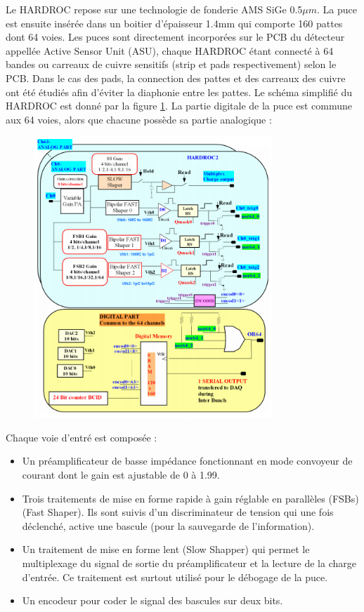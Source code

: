 Le HARDROC repose sur une technologie de fonderie AMS SiGe 0.5$\mu m$. La puce est ensuite insérée dans un boitier d'épaisseur 1.4mm qui comporte 160 pattes dont 64 voies. Les puces sont directement incorporées sur le PCB du détecteur appellée Active Sensor Unit (ASU), chaque HARDROC étant connecté à 64 bandes ou carreaux de cuivre sensitifs (strip et pads respectivement) selon le PCB. Dans le cas des pads, la connection des pattes et des carreaux des cuivre ont été étudiés afin d'éviter la diaphonie entre les pattes.
Le schéma simplifié du HARDROC est donné par la figure \ref{scheme}. La partie digitale de la puce est commune aux 64 voies, alors que chacune possède sa partie analogique :
\begin{figure}[h!]
	\centering
	\includegraphics[width=0.8\textwidth]{GLA/scheme.png}
	\label{scheme}
\end{figure}

Chaque voie d'entré est composée :
\begin{itemize}[label=$\bullet$]
	\item Un préamplificateur de basse impédance fonctionnant en mode convoyeur de courant dont le gain est ajustable de 0 à 1.99.
	\item Trois traitements de mise en forme rapide à gain réglable en parallèles (FSBs) (Fast Shaper). Ils sont suivis d'un discriminateur de tension qui une fois déclenché, active une bascule (pour la sauvegarde de l'information).
	\item Un traitement de mise en forme lent (Slow Shapper) qui permet le multiplexage du signal de sortie du préamplificateur et la lecture de la charge d'entrée. Ce traitement est surtout utilisé pour le débogage de la puce.
	\item Un encodeur pour coder le signal des bascules sur deux bits.
\end{itemize}

